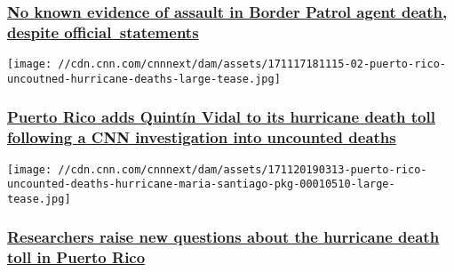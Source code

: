 \hypertarget{no-known-evidence-of-assault-in-border-patrol-agent-death-despite-official-statements}{%
\subsubsection{\texorpdfstring{\href{/2017/11/30/us/no-known-evidence-assault-border-patrol-agent-death-invs/index.html}{No
known evidence of assault in Border Patrol agent death, despite
official~statements}}{No known evidence of assault in Border Patrol agent death, despite official~statements}}\label{no-known-evidence-of-assault-in-border-patrol-agent-death-despite-official-statements}}

\href{/2017/11/30/health/puerto-rico-death-toll-update-quintin-vidal/index.html}{}

\texttt{[image: //cdn.cnn.com/cnnnext/dam/assets/171117181115-02-puerto-rico-uncoutned-hurricane-deaths-large-tease.jpg]}

\hypertarget{puerto-rico-adds-quintuxedn-vidal-to-its-hurricane-death-toll-following-a-cnn-investigation-into-uncounted-deaths}{%
\subsubsection{\texorpdfstring{\href{/2017/11/30/health/puerto-rico-death-toll-update-quintin-vidal/index.html}{Puerto
Rico adds Quintín Vidal to its hurricane death toll following a CNN
investigation into uncounted
deaths}}{Puerto Rico adds Quintín Vidal to its hurricane death toll following a CNN investigation into uncounted deaths}}\label{puerto-rico-adds-quintuxedn-vidal-to-its-hurricane-death-toll-following-a-cnn-investigation-into-uncounted-deaths}}

\href{/2017/11/29/health/demographers-puerto-rico-death-toll-estimate-invs/index.html}{}

\texttt{[image: //cdn.cnn.com/cnnnext/dam/assets/171120190313-puerto-rico-uncounted-deaths-hurricane-maria-santiago-pkg-00010510-large-tease.jpg]}

\hypertarget{researchers-raise-new-questions-about-the-hurricane-death-toll-in-puerto-rico}{%
\subsubsection{\texorpdfstring{\href{/2017/11/29/health/demographers-puerto-rico-death-toll-estimate-invs/index.html}{Researchers
raise new questions about the hurricane death toll in Puerto
Rico}}{Researchers raise new questions about the hurricane death toll in Puerto Rico}}\label{researchers-raise-new-questions-about-the-hurricane-death-toll-in-puerto-rico}}

